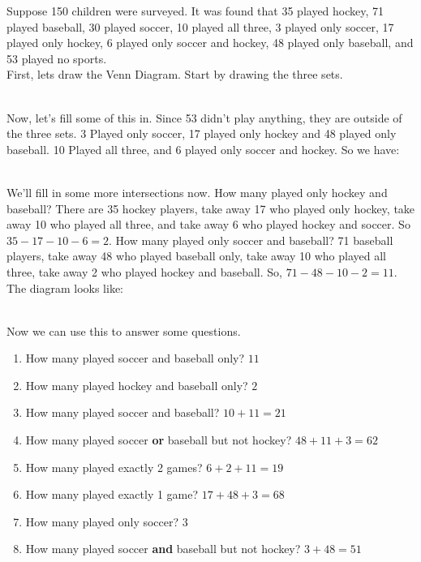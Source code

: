 \myexample
{
	Suppose 150 children were surveyed. It was found that 35 played hockey, 71 played baseball, 30 played soccer, 10 played all three, 3 played only soccer, 17 played only hockey, 6 played only soccer and hockey, 48 played only baseball, and 53 played no sports.\\
	First, lets draw the Venn Diagram. Start by drawing the three sets.\\
	\begin{venndiagram3sets}[shade=skyblue,labelA={H},labelB={B},labelC={S},labelNotABC={$\mathcal{U}$}]
	\end{venndiagram3sets}\\
	Now, let's fill some of this in. Since 53 didn't play anything, they are outside of the three sets. 3 Played only soccer, 17 played only hockey and 48 played only baseball. 10 Played all three, and 6 played only soccer and hockey. So we have:\\
	\begin{venndiagram3sets}[shade=skyblue,labelA={H},labelB={B},labelC={S},labelNotABC={\quad $\mathcal{U} \quad 53$},labelOnlyA={17},labelOnlyB={48},labelOnlyC={3},labelABC={10},labelOnlyAC={6}]
	\end{venndiagram3sets}\\
	We'll fill in some more intersections now. How many played only hockey and baseball? There are 35 hockey players, take away 17 who played only hockey, take away 10 who played all three, and take away 6 who played hockey and soccer. So $35-17-10-6=2$. How many played only soccer and baseball? 71 baseball players, take away 48 who played baseball only, take away 10 who played all three, take away 2 who played hockey and baseball. So, $71-48-10-2=11$. The diagram looks like:\\
	\begin{venndiagram3sets}[shade=skyblue,labelA={H},labelB={B},labelC={S},labelNotABC={\quad $\mathcal{U} \quad 53$},labelOnlyA={17},labelOnlyB={48},labelOnlyC={3},labelABC={10},labelOnlyAB={2},labelOnlyBC={11},labelOnlyAC={6}]
	\end{venndiagram3sets}\\
	Now we can use this to answer some questions.
	\begin{enumerate}
		\item How many played soccer and baseball only? $11$
		\item How many played hockey and baseball only? $2$
		\item How many played soccer and baseball? $10+11=21$
		\item How many played soccer {\bf or} baseball but not hockey? $48+11+3=62$
		\item How many played exactly 2 games? $6+2+11=19$
		\item How many played exactly 1 game? $17+48+3=68$
		\item How many played only soccer? $3$
		\item How many played soccer {\bf and} baseball but not hockey? $3+48=51$
	\end{enumerate}
}

